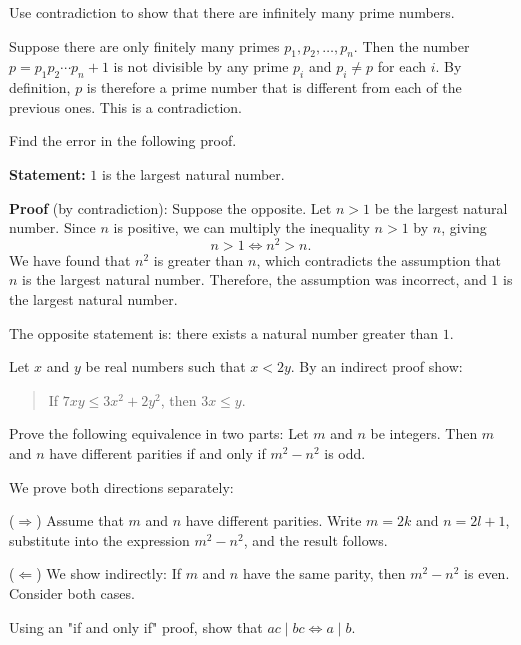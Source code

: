 \documentclass[11pt,paper=b5,footinclude,headinclude]{scrbook} %
\theoremstyle{remark}
\theoremstyle{definition} %
\theoremstyle{theorem} %
\newtheorem{ex}{Exercise\hypertarget{sol:\theex}}[chapter]
\begin{document}
\begin{ex}
    \end{ex} \begin{ex} Use contradiction to show that there are infinitely many prime numbers.
\begin{sol}
    Suppose there are only finitely many primes $p_1, p_2, \ldots, p_n$. Then the number $p = p_1 p_2 \cdots p_n + 1$ is not divisible by any prime $p_i$ and $p_i \neq p$ for each $i$. By definition, $p$ is therefore a prime number that is different from each of the previous ones. This is a contradiction.
\end{sol}
    \end{ex} \begin{ex} Find the error in the following proof.

    \textbf{Statement:} $1$ is the largest natural number.

    \textbf{Proof} (by contradiction):
    Suppose the opposite. Let $n > 1$ be the largest natural number. Since $n$ is positive, we can multiply the inequality $n > 1$ by $n$, giving
    \[
    n > 1 \Leftrightarrow n^2 > n.
    \]
    We have found that $n^2$ is greater than $n$, which contradicts the assumption that $n$ is the largest natural number. Therefore, the assumption was incorrect, and $1$ is the largest natural number.
\begin{sol}
    The opposite statement is: there exists a natural number greater than $1$.
\end{sol}


\end{ex} \begin{ex} Let  $x$ and $y$ be real numbers such that $x<2y$. 
By an indirect proof show: 
\begin{quote}
    If $7xy\leq 3x^2 + 2y^2$, then $3x\leq y$.
\end{quote}


    \end{ex} 
    \begin{ex} Prove the following equivalence in two parts: Let $m$ and $n$ be integers. Then $m$ and $n$ have different parities if and only if $m^2 - n^2$ is odd.
\begin{sol}We prove both directions separately:

($\Rightarrow$) Assume that $m$ and $n$ have different parities. Write $m = 2k$ and $n = 2l + 1$, substitute into the expression $m^2 - n^2$, and the result follows.

    ($\Leftarrow$) We show indirectly: If $m$ and $n$ have the same parity, then $m^2 - n^2$ is even. Consider both cases.
\end{sol}


    \end{ex} \begin{ex} Using an "if and only if" proof, show that $ac \mid bc \Leftrightarrow a \mid b$.

    \end{ex}
\end{document}

